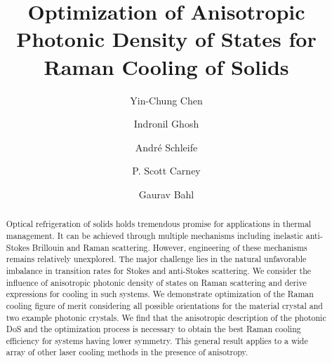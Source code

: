 \documentclass[%
 reprint,
superscriptaddress,
 amsmath,amssymb,
 aps,
pra,
]{revtex4-1}
\begin{document}
\title{Optimization of Anisotropic Photonic Density of States for Raman Cooling of Solids}


\author{Yin-Chung Chen}


\author{Indronil Ghosh}


\author{Andr\'{e} Schleife}


\author{P. Scott Carney}

\author{Gaurav Bahl}


\begin{abstract}
Optical refrigeration of solids holds tremendous promise for applications in thermal management. It can be achieved through multiple mechanisms including inelastic anti-Stokes Brillouin and Raman scattering. However, engineering of these mechanisms remains relatively unexplored. The major challenge lies in the natural unfavorable imbalance in transition rates for Stokes and anti-Stokes scattering.  We consider the influence of anisotropic photonic density of states on Raman scattering and derive expressions for cooling in such systems.  We demonstrate optimization of the Raman cooling figure of merit considering all possible orientations for the material crystal and two example photonic crystals. We find that the anisotropic description of the photonic DoS and the optimization process is necessary to obtain the best Raman cooling efficiency for systems having lower symmetry. This general result applies to a wide array of other laser cooling methods in the presence of anisotropy.
\end{abstract}


\maketitle
\end{document}

